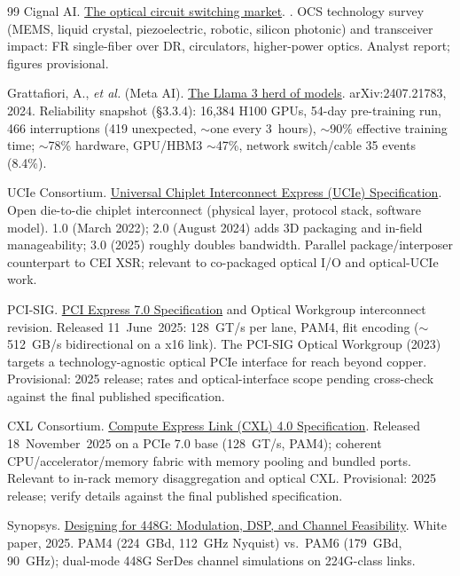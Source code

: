 \begin{thebibliography}{99}
Cignal AI.
\newblock \href{https://cignal.ai/2025/12/the-optical-circuit-switching-market-4q25/}{The optical circuit switching market}.
.
\newblock OCS technology survey (MEMS, liquid crystal, piezoelectric, robotic, silicon
photonic) and transceiver impact: FR single-fiber over DR, circulators, higher-power
optics. Analyst report; figures provisional.

Grattafiori, A., \emph{et al.} (Meta AI).
\newblock \href{https://arxiv.org/abs/2407.21783}{The Llama 3 herd of models}.
\newblock arXiv:2407.21783, 2024.
\newblock Reliability snapshot (\S3.3.4): 16{,}384 H100 GPUs, 54-day pre-training run,
466 interruptions (419 unexpected, $\sim$one every 3~hours), $\sim$90\% effective
training time; $\sim$78\% hardware, GPU/HBM3 $\sim$47\%, network switch/cable 35
events (8.4\%).

UCIe Consortium.
\newblock \href{https://www.uciexpress.org/}{Universal Chiplet Interconnect Express (UCIe) Specification}.
\newblock Open die-to-die chiplet interconnect (physical layer, protocol stack,
software model). 1.0 (March 2022); 2.0 (August 2024) adds 3D packaging and in-field
manageability; 3.0 (2025) roughly doubles bandwidth. Parallel package/interposer
counterpart to CEI XSR; relevant to co-packaged optical I/O and optical-UCIe work.

PCI-SIG.
\newblock \href{https://pcisig.com/}{PCI Express 7.0 Specification} and Optical Workgroup interconnect revision.
\newblock Released 11~June~2025: 128~GT/s per lane, PAM4, flit encoding
($\sim$512~GB/s bidirectional on a x16 link). The PCI-SIG Optical Workgroup (2023)
targets a technology-agnostic optical PCIe interface for reach beyond copper.
Provisional: 2025 release; rates and optical-interface scope pending cross-check
against the final published specification.

CXL Consortium.
\newblock \href{https://computeexpresslink.org/}{Compute Express Link (CXL) 4.0 Specification}.
\newblock Released 18~November~2025 on a PCIe 7.0 base (128~GT/s, PAM4); coherent
CPU/accelerator/memory fabric with memory pooling and bundled ports. Relevant to
in-rack memory disaggregation and optical CXL. Provisional: 2025 release; verify
details against the final published specification.

Synopsys.
\newblock \href{https://www.synopsys.com/content/dam/synopsys/white-papers/designing-for-448g-modulation-dsp-wp.pdf}{Designing for 448G: Modulation, DSP, and Channel Feasibility}.
\newblock White paper, 2025.
\newblock PAM4 (224~GBd, 112~GHz Nyquist) vs.\ PAM6 (179~GBd, 90~GHz); dual-mode
448G SerDes channel simulations on 224G-class links.


\end{thebibliography}
